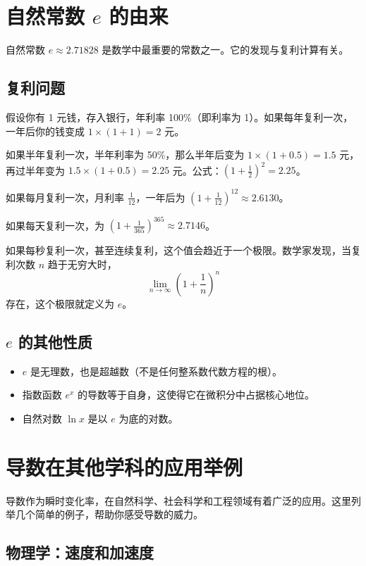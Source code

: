 \documentclass[10pt]{article}
\begin{document}
\section{自然常数 $e$ 的由来}

自然常数 $e \approx 2.71828$ 是数学中最重要的常数之一。它的发现与复利计算有关。

\subsection{复利问题}

假设你有 1 元钱，存入银行，年利率 100\%（即利率为 1）。如果每年复利一次，一年后你的钱变成 $1 \times (1+1) = 2$ 元。

如果半年复利一次，半年利率为 50\%，那么半年后变为 $1 \times (1+0.5) = 1.5$ 元，再过半年变为 $1.5 \times (1+0.5) = 2.25$ 元。公式：$(1+\frac{1}{2})^2 = 2.25$。

如果每月复利一次，月利率 $\frac{1}{12}$，一年后为 $(1+\frac{1}{12})^{12} \approx 2.6130$。

如果每天复利一次，为 $(1+\frac{1}{365})^{365} \approx 2.7146$。

如果每秒复利一次，甚至连续复利，这个值会趋近于一个极限。数学家发现，当复利次数 $n$ 趋于无穷大时，
$$
\lim_{n \to \infty} \left(1 + \frac{1}{n}\right)^n
$$
存在，这个极限就定义为 $e$。

\subsection{$e$ 的其他性质}

\begin{itemize}
    \item $e$ 是无理数，也是超越数（不是任何整系数代数方程的根）。
    \item 指数函数 $e^x$ 的导数等于自身，这使得它在微积分中占据核心地位。
    \item 自然对数 $\ln x$ 是以 $e$ 为底的对数。
\end{itemize}

\section{导数在其他学科的应用举例}

导数作为瞬时变化率，在自然科学、社会科学和工程领域有着广泛的应用。这里列举几个简单的例子，帮助你感受导数的威力。

\subsection{物理学：速度和加速度}
\end{document}
